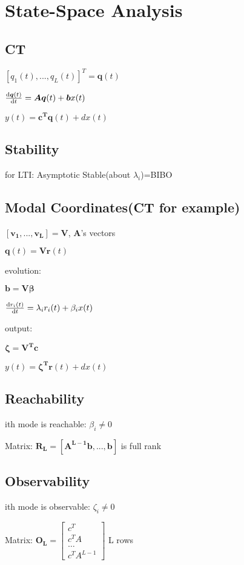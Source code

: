 \section{State-Space Analysis}
\subsection*{CT}
$[q_1(t),...,q_L(t)]^T=\boldsymbol{q}(t)$

$\frac{\mathrm{d} \boldsymbol{q}(t)}{\mathrm{d} t}=\boldsymbol{Aq}(t)+\boldsymbol{b}x(t)$

$y(t)=\boldsymbol{c^Tq}(t)+dx(t)$

\subsection*{Stability}

for LTI: Asymptotic Stable(about $\lambda_i$)=BIBO

\subsection*{Modal Coordinates(CT for example)}

$[\boldsymbol{v_1},...,\boldsymbol{v_L}]=\boldsymbol{V}$,   $\boldsymbol{A}$'s vectors

$\boldsymbol{q}(t)=\boldsymbol{Vr}(t)$

evolution:  

$\boldsymbol{b}=\boldsymbol{V\beta}$

$\frac{\mathrm{d} r_i(t)}{\mathrm{d} t}=\lambda_i r_i(t) + \beta_i x(t)$

output:   

$\boldsymbol{\zeta}=\boldsymbol{V^T c}$

$y(t)=\boldsymbol{\zeta^Tr}(t)+dx(t)$

\subsection*{Reachability}

ith mode is reachable: $\beta_i \neq 0$

Matrix: $\boldsymbol{R_L}=[\boldsymbol{A^{L-1}b}, ..., \boldsymbol{b}]$ is full rank

\subsection*{Observability}

ith mode is observable: $\zeta_i \neq 0$

Matrix: $\boldsymbol{O_L}=\begin{bmatrix}c^T\\c^TA\\\ldots\\ c^TA^{L-1}\end{bmatrix}$   L rows